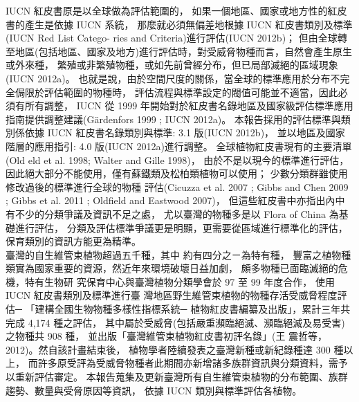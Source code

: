 \begin{multicols}{2}
IUCN 紅皮書原是以全球做為評估範圍的， 如果一個地區、國家或地方性的紅皮書的產生是依據 IUCN 系統，
那麼就必須無偏差地根據 IUCN 紅皮書類別及標準(IUCN Red List Catego- ries and Criteria)進行評估(IUCN 2012b)；
但由全球轉至地區(包括地區、國家及地方)進行評估時，對受威脅物種而言，自然會產生原生或外來種，
繁殖或非繁殖物種，或如先前曾經分布，但已局部滅絕的區域現象(IUCN 2012a)。
也就是說，由於空間尺度的關係，當全球的標準應用於分布不完全侷限於評估範圍的物種時，
評估流程與標準設定的閥值可能並不適當，因此必須有所有調整，
IUCN 從 1999 年開始對於紅皮書名錄地區及國家級評估標準應用指南提供調整建議(Gärdenfors 1999 ; IUCN 2012a)。
本報告採用的評估標準與類別係依據 IUCN 紅皮書名錄類別與標準: 3.1 版(IUCN 2012b)，
並以地區及國家階層的應用指引: 4.0 版(IUCN 2012a)進行調整。
全球植物紅皮書現有的主要清單(Old eld et al. 1998; Walter and Gille  1998)，
由於不是以現今的標準進行評估，因此絕大部分不能使用，僅有蘇鐵類及松柏類植物可以使用；
少數分類群雖使用修改過後的標準進行全球的物種 評估(Cicuzza et al. 2007 ; Gibbs and Chen
2009 ; Gibbs et al. 2011 ; Oldfield and Eastwood 2007)，
但這些紅皮書中亦指出內中有不少的分類爭議及資訊不足之處，
尤以臺灣的物種多是以 Flora of China 為基礎進行評估，
分類及評估標準爭議更是明顯，更需要從區域進行標準化的評估，保育類別的資訊方能更為精準。\\

臺灣的自生維管束植物超過五千種，其中 約有四分之ㄧ為特有種，
豐富之植物種類實為國家重要的資源，然近年來環境破壞日益加劇，
頗多物種已面臨滅絕的危機，特有生物研 究保育中心與臺灣植物分類學會於 97 至 99 年度合作，
使用 IUCN 紅皮書類別及標準進行臺 灣地區野生維管束植物的物種存活受威脅程度評估─
「建構全國生物物種多樣性指標系統─ 植物紅皮書編纂及出版」，累計三年共完成 4,174 種之評估，
其中屬於受威脅(包括嚴重瀕臨絕滅、瀕臨絕滅及易受害)之物種共 908 種，
並出版「臺灣維管束植物紅皮書初評名錄」(王 震哲等，2012)。然自該計畫結束後，
植物學者陸續發表之臺灣新種或新紀錄種達 300 種以 上，
而許多原受評為受威脅物種者此期間亦新增諸多族群資訊與分類資料，需予以重新評估審定。
本報告蒐集及更新臺灣所有自生維管束植物的分布範圍、族群趨勢、數量與受脅原因等資訊，
依據 IUCN 類別與標準評估各植物。\\
\end{multicols}

%
